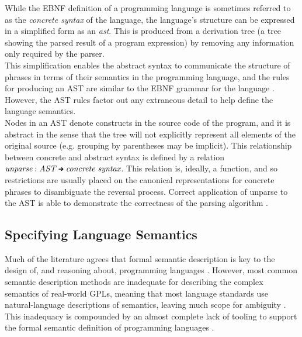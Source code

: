 While the EBNF definition of a programming language is sometimes referred to as the \textit{concrete syntax} of the language, the language's structure can be expressed in a simplified form as an \textit{\gls{ast}}.
This is produced from a derivation tree (a tree showing the parsed result of a program expression) by removing any information only required by the parser.\\

This simplification enables the abstract syntax to communicate the structure of phrases in terms of their semantics in the programming language, and the rules for producing an AST are similar to the EBNF grammar for the language \citep{slonneger1995formal}.
However, the AST rules factor out any extraneous detail to help define the language semantics. \\

Nodes in an AST denote constructs in the source code of the program, and it is abstract in the sense that the tree will not explicitly represent all elements of the original source (e.g. grouping by parentheses may be implicit). 
This relationship between concrete and abstract syntax is defined by a relation $\textit{unparse} : \textit{AST} \mathgoesto \textit{concrete syntax}$.
This relation is, ideally, a function, and so restrictions are usually placed on the canonical representations for concrete phrases to disambiguate the reversal process. 
Correct application of unparse to the AST is able to demonstrate the correctness of the parsing algorithm \citep[pg. 29]{slonneger1995formal}.



\subsection{Specifying Language Semantics} %
\label{sub:specifying_language_semantics}

Much of the literature agrees that formal semantic description is key to the design of, and reasoning about, programming languages \citep{Zhang:2004:SSD:981009.981013,mosses1986use,Binsbergen:2016:TSC:2892664.2893464}.
However, most common semantic description methods are inadequate for describing the complex semantics of real-world GPLs, meaning that most language standards use natural-language descriptions of semantics, leaving much scope for ambiguity \citep{mosses1986use}.
This inadequacy is compounded by an almost complete lack of tooling to support the formal semantic definition of programming languages \citep{Binsbergen:2016:TSC:2892664.2893464}.\\

